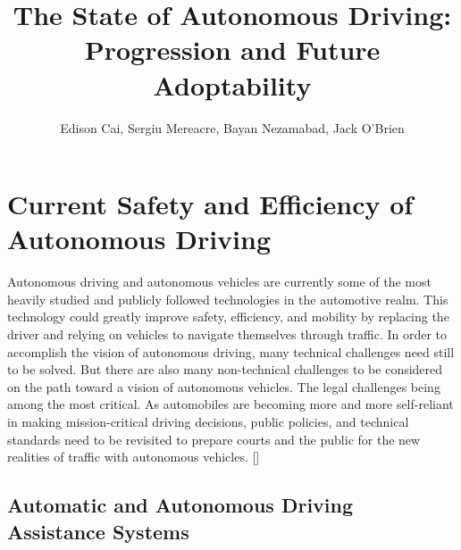 \documentclass{article}
\author{Edison Cai, Sergiu Mereacre, Bayan Nezamabad, Jack O'Brien}
\title{The State of Autonomous Driving: Progression and Future Adoptability}
\begin{document}
\maketitle

\section{Current Safety and Efficiency of Autonomous Driving}

Autonomous driving and autonomous vehicles are currently some of the most heavily studied and publicly followed technologies in the automotive realm. This technology could greatly improve safety, efficiency, and mobility by replacing the driver and relying on vehicles to navigate themselves through traffic. In order to accomplish the vision of autonomous driving, many technical challenges need still to be solved. But there are also many non-technical challenges to be considered on the path toward a vision of autonomous vehicles. The legal challenges being among the most critical. As automobiles are becoming more and more self-reliant in making mission-critical driving decisions, public policies, and technical standards need to be revisited to prepare courts and the public for the new realities of traffic with autonomous vehicles. [\textcite{beiker2012legal}]

\subsection{Automatic and Autonomous Driving Assistance Systems}
\end{document}
